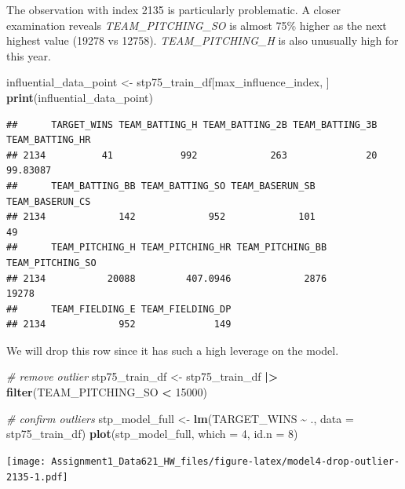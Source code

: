 \documentclass[
]{article}
\newenvironment{Shaded}{\begin{snugshade}}{\end{snugshade}}
\newcommand{\AttributeTok}[1]{\textcolor[rgb]{0.13,0.29,0.53}{#1}}
\newcommand{\CommentTok}[1]{\textcolor[rgb]{0.56,0.35,0.01}{\textit{#1}}}
\newcommand{\DecValTok}[1]{\textcolor[rgb]{0.00,0.00,0.81}{#1}}
\newcommand{\FunctionTok}[1]{\textcolor[rgb]{0.13,0.29,0.53}{\textbf{#1}}}
\newcommand{\NormalTok}[1]{#1}
\newcommand{\OtherTok}[1]{\textcolor[rgb]{0.56,0.35,0.01}{#1}}
\newcommand{\SpecialCharTok}[1]{\textcolor[rgb]{0.81,0.36,0.00}{\textbf{#1}}}
\begin{document}
The observation with index 2135 is particularly problematic. A closer
examination reveals \emph{TEAM\_PITCHING\_SO} is almost 75\% higher as
the next highest value (19278 vs 12758). \emph{TEAM\_PITCHING\_H} is
also unusually high for this year.

\begin{Shaded}
\begin{Highlighting}[]
\NormalTok{influential\_data\_point }\OtherTok{\textless{}{-}}\NormalTok{ stp75\_train\_df[max\_influence\_index, ]}
\FunctionTok{print}\NormalTok{(influential\_data\_point)}
\end{Highlighting}
\end{Shaded}

\begin{verbatim}
##      TARGET_WINS TEAM_BATTING_H TEAM_BATTING_2B TEAM_BATTING_3B TEAM_BATTING_HR
## 2134          41            992             263              20        99.83087
##      TEAM_BATTING_BB TEAM_BATTING_SO TEAM_BASERUN_SB TEAM_BASERUN_CS
## 2134             142             952             101              49
##      TEAM_PITCHING_H TEAM_PITCHING_HR TEAM_PITCHING_BB TEAM_PITCHING_SO
## 2134           20088         407.0946             2876            19278
##      TEAM_FIELDING_E TEAM_FIELDING_DP
## 2134             952              149
\end{verbatim}

We will drop this row since it has such a high leverage on the model.

\begin{Shaded}
\begin{Highlighting}[]
\CommentTok{\# remove outlier }
\NormalTok{stp75\_train\_df }\OtherTok{\textless{}{-}}\NormalTok{ stp75\_train\_df }\SpecialCharTok{|\textgreater{}}
  \FunctionTok{filter}\NormalTok{(TEAM\_PITCHING\_SO }\SpecialCharTok{\textless{}} \DecValTok{15000}\NormalTok{)}

\CommentTok{\# confirm outliers}
\NormalTok{stp\_model\_full }\OtherTok{\textless{}{-}} \FunctionTok{lm}\NormalTok{(TARGET\_WINS }\SpecialCharTok{\textasciitilde{}}\NormalTok{ ., }\AttributeTok{data =}\NormalTok{ stp75\_train\_df)}
\FunctionTok{plot}\NormalTok{(stp\_model\_full, }\AttributeTok{which =} \DecValTok{4}\NormalTok{,  }\AttributeTok{id.n =} \DecValTok{8}\NormalTok{)}
\end{Highlighting}
\end{Shaded}

\texttt{[image: Assignment1\_Data621\_HW\_files/figure-latex/model4-drop-outlier-2135-1.pdf]}
\end{document}
